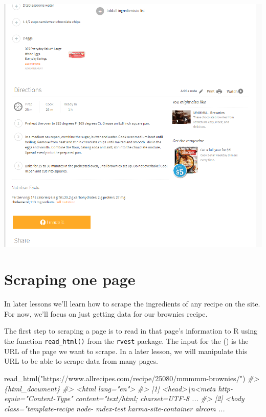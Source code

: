 \documentclass[
  12pt,
]{book}
\newenvironment{Shaded}{\begin{snugshade}}{\end{snugshade}}
\newcommand{\CommentTok}[1]{\textcolor[rgb]{0.37,0.37,0.37}{\textit{#1}}}
\newcommand{\FunctionTok}[1]{\textcolor[rgb]{0,0,0}{#1}}
\newcommand{\NormalTok}[1]{#1}
\newcommand{\StringTok}[1]{\textcolor[rgb]{0.5,0.5,0.5}{#1}}
\begin{document}
\includegraphics{images/brownies_2.PNG}

\hypertarget{scraping-one-page}{%
\section{Scraping one page}\label{scraping-one-page}}

In later lessons we'll learn how to scrape the ingredients of any recipe on the site. For now, we'll focus on just getting data for our brownies recipe.

The first step to scraping a page is to read in that page's information to R using the function \texttt{read\_html()} from the \texttt{rvest} package. The input for the () is the URL of the page we want to scrape. In a later lesson, we will manipulate this URL to be able to scrape data from many pages.

\begin{Shaded}
\begin{Highlighting}[]
\FunctionTok{read\_html}\NormalTok{(}\StringTok{"https://www.allrecipes.com/recipe/25080/mmmmm{-}brownies/"}\NormalTok{)}
\CommentTok{\#\textgreater{} \{html\_document\}}
\CommentTok{\#\textgreater{} \textless{}html lang="en"\textgreater{}}
\CommentTok{\#\textgreater{} [1] \textless{}head\textgreater{}\textbackslash{}n\textless{}meta http{-}equiv="Content{-}Type" content="text/html; charset=UTF{-}8 ...}
\CommentTok{\#\textgreater{} [2] \textless{}body class="template{-}recipe node{-} mdex{-}test karma{-}site{-}container alrcom  ...}
\end{Highlighting}
\end{Shaded}
\end{document}
